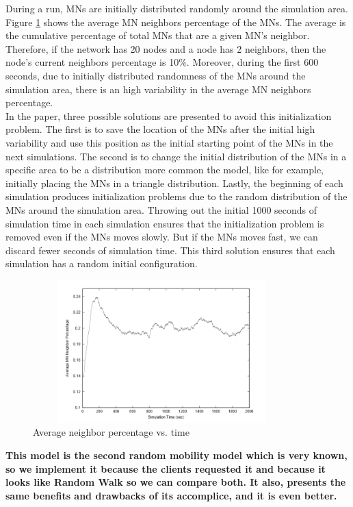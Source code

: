 During a run, MNs are initially distributed randomly around the simulation area. Figure \ref{RandomWaypointFig2} shows the average MN neighbors percentage of the MNs. The average is the cumulative percentage of total MNs that are a given MN's neighbor. Therefore, if the network has 20 nodes and a node has 2 neighbors, then the node's current neighbors percentage is 10\%. Moreover, during the first 600 seconds, due to initially distributed randomness of the MNs around the simulation area, there is an high variability in the average MN neighbors percentage.\\
In the paper, three possible solutions are presented to avoid this initialization problem. The first is to save the location of the MNs after the initial high variability and use this position as the initial starting point of the MNs in the next simulations. The second is to change the initial distribution of the MNs in a specific area to be a distribution more common the model, like for example, initially placing the MNs in a triangle distribution. Lastly, the beginning of each simulation produces initialization problems due to the random distribution of the MNs around the simulation area. Throwing out the initial 1000 seconds of simulation time in each simulation ensures that the initialization problem is removed even if the MNs moves slowly. But if the MNs moves fast, we can discard fewer seconds of simulation time. This third solution ensures that each simulation has a random initial configuration.\\

\begin{figure}[h]
\center
\includegraphics[width=10cm,height=55mm]{../images/randomwaypoint2.png}
\caption{\label{RandomWaypointFig2}Average neighbor percentage vs. time\cite{SurveyMobilityModelsAdHoc1}}
\end{figure}

\textbf{This model is the second random mobility model which is very known, so we implement it because the clients requested it and because it looks like Random Walk so we can compare both. It also, presents the same benefits and drawbacks of its accomplice, and it is even better.}\\

